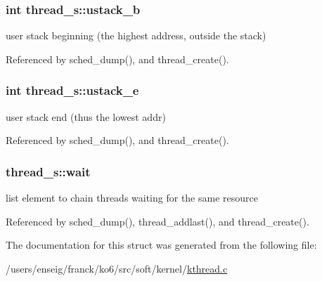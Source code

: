 \hypertarget{structthread__s_a8d51270c2f7572479276f7629940c3ea}{
\subsubsection[{ustack\-\_\-b}]{\setlength{\rightskip}{0pt plus 5cm}int thread\-\_\-s\-::ustack\-\_\-b}}\label{structthread__s_a8d51270c2f7572479276f7629940c3ea}


user stack beginning (the highest address, outside the stack) 



Referenced by sched\-\_\-dump(), and thread\-\_\-create().

\hypertarget{structthread__s_a021e8a50ddb4a5978f18d6babfc4ea6e}{
\subsubsection[{ustack\-\_\-e}]{\setlength{\rightskip}{0pt plus 5cm}int thread\-\_\-s\-::ustack\-\_\-e}}\label{structthread__s_a021e8a50ddb4a5978f18d6babfc4ea6e}


user stack end (thus the lowest addr) 



Referenced by sched\-\_\-dump(), and thread\-\_\-create().

\hypertarget{structthread__s_a291769866cccb5d37937ef14cedc38bf}{
\subsubsection[{wait}]{ thread\-\_\-s\-::wait}}\label{structthread__s_a291769866cccb5d37937ef14cedc38bf}


list element to chain threads waiting for the same resource 



Referenced by sched\-\_\-dump(), thread\-\_\-addlast(), and thread\-\_\-create().



The documentation for this struct was generated from the following file\-:\begin{DoxyCompactItemize}
\item 
/users/enseig/franck/ko6/src/soft/kernel/\hyperlink{kthread_8c}{kthread.\-c}\end{DoxyCompactItemize}
